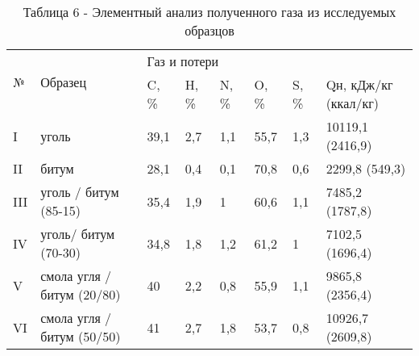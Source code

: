 \begin{table}[H]
\caption*{Таблица 6 - Элементный анализ полученного газа из исследуемых образцов}
\centering
\begin{tabular}{|l|l|llllll|}
\hline
\multirow{2}{*}{№} & \multirow{2}{*}{Образец} & \multicolumn{6}{l|}{Газ и потери} \\ \cline{3-8}
 &  & \multicolumn{1}{l|}{C, \%} & \multicolumn{1}{l|}{H, \%} & \multicolumn{1}{l|}{N, \%} & \multicolumn{1}{l|}{O, \%} & \multicolumn{1}{l|}{S, \%} & Qн, кДж/кг (ккал/кг) \\ \hline
I & уголь & \multicolumn{1}{l|}{39,1} & \multicolumn{1}{l|}{2,7} & \multicolumn{1}{l|}{1,1} & \multicolumn{1}{l|}{55,7} & \multicolumn{1}{l|}{1,3} & 10119,1 (2416,9) \\ \hline
II & битум & \multicolumn{1}{l|}{28,1} & \multicolumn{1}{l|}{0,4} & \multicolumn{1}{l|}{0,1} & \multicolumn{1}{l|}{70,8} & \multicolumn{1}{l|}{0,6} & 2299,8 (549,3) \\ \hline
III & уголь / битум (85-15) & \multicolumn{1}{l|}{35,4} & \multicolumn{1}{l|}{1,9} & \multicolumn{1}{l|}{1} & \multicolumn{1}{l|}{60,6} & \multicolumn{1}{l|}{1,1} & 7485,2 (1787,8) \\ \hline
IV & уголь/ битум (70-30) & \multicolumn{1}{l|}{34,8} & \multicolumn{1}{l|}{1,8} & \multicolumn{1}{l|}{1,2} & \multicolumn{1}{l|}{61,2} & \multicolumn{1}{l|}{1} & 7102,5 (1696,4) \\ \hline
V & смола угля / битум (20/80) & \multicolumn{1}{l|}{40} & \multicolumn{1}{l|}{2,2} & \multicolumn{1}{l|}{0,8} & \multicolumn{1}{l|}{55,9} & \multicolumn{1}{l|}{1,1} & 9865,8 (2356,4) \\ \hline
VI & смола угля / битум (50/50) & \multicolumn{1}{l|}{41} & \multicolumn{1}{l|}{2,7} & \multicolumn{1}{l|}{1,8} & \multicolumn{1}{l|}{53,7} & \multicolumn{1}{l|}{0,8} & 10926,7 (2609,8) \\ \hline
\end{tabular}
\end{table}

